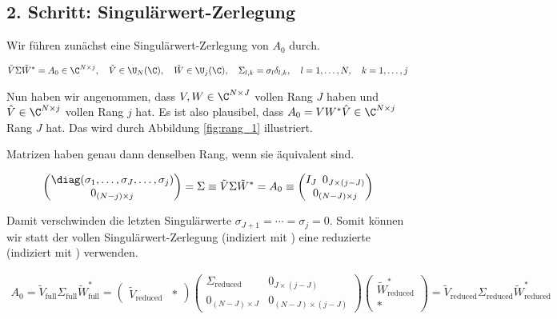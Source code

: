\subsection*{2. Schritt: Singulärwert-Zerlegung}

Wir führen zunächst eine Singulärwert-Zerlegung von $A_0$ durch.

\begin{align*}
    \tilde V \Sigma \tilde W^\ast = A_0 \in \C^{N \times j},
    \quad
    \tilde V \in \U_N(\C),
    \quad
    \tilde W \in \U_j(\C),
    \quad
    \Sigma_{l, k} = \sigma_l \delta_{l, k},
    \quad
    l = 1, \dots, N,
    \quad
    k = 1, \dots, j
\end{align*}

Nun haben wir angenommen, dass $V, W \in \C^{N \times J}$ vollen Rang $J$ haben und $\hat V \in \C^{N \times j}$ vollen Rang $j$ hat.
Es ist also plausibel, dass $A_0 = V W^\ast \hat V \in \C^{N \times j}$ Rang $J$ hat.
Das wird durch Abbildung \ref{fig:rang_1} illustriert.



Matrizen haben genau dann denselben Rang, wenn sie äquivalent sind.

\begin{align*}
    \begin{pmatrix}
        \diag(\sigma_1, \dots, \sigma_J, \dots, \sigma_j) \\
        0_{(N - j) \times j}
    \end{pmatrix}
    =
    \Sigma
    \equiv
    \tilde V \Sigma \tilde W^\ast
    =
    A_0
    \equiv
    \begin{pmatrix}
        I_J \enspace 0_{J \times (j - J)} \\ 0_{(N - J) \times j}
    \end{pmatrix}
\end{align*}

Damit verschwinden die letzten Singulärwerte $\sigma_{J+1} = \cdots = \sigma_j = 0$.
Somit können wir statt der vollen Singulärwert-Zerlegung (indiziert mit ) eine reduzierte (indiziert mit ) verwenden.

\begin{align*}
    A_0
    =
    \tilde V_\mathrm{full} \Sigma_\mathrm{full} \tilde W_\mathrm{full}^\ast
    =
    \begin{pmatrix}
        \tilde V_\mathrm{reduced} & \ast
    \end{pmatrix}
    \begin{pmatrix}
        \Sigma_\mathrm{reduced} & 0_{J \times (j - J)}       \\
        0_{(N - J) \times J}    & 0_{(N - J) \times (j - J)}
    \end{pmatrix}
    \begin{pmatrix}
        \tilde W_\mathrm{reduced}^\ast \\ \ast
    \end{pmatrix}
    =
    \tilde V_\mathrm{reduced} \Sigma_\mathrm{reduced} \tilde W_\mathrm{reduced}^\ast
\end{align*}

